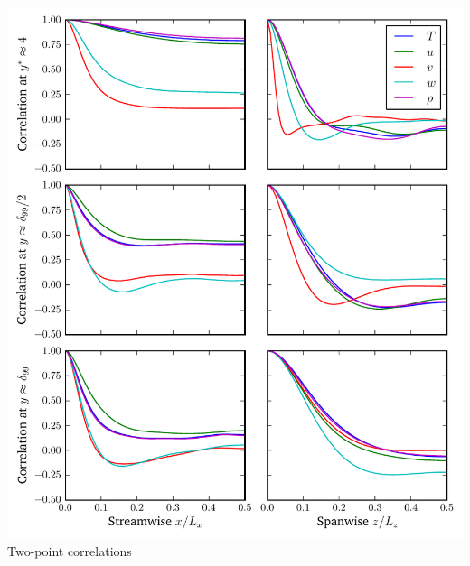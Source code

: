 \documentclass[mathserif]{beamer}
\begin{document}
\begin{frame}
\begin{columns}
\begin{column}{0.5\linewidth}
          \includegraphics[width=\textwidth]{autocorr-redux2299}
          \\\vspace{-0.5em}
          Two-point correlations
        \end{column}
    \end{columns}
\end{frame}
\end{document}
